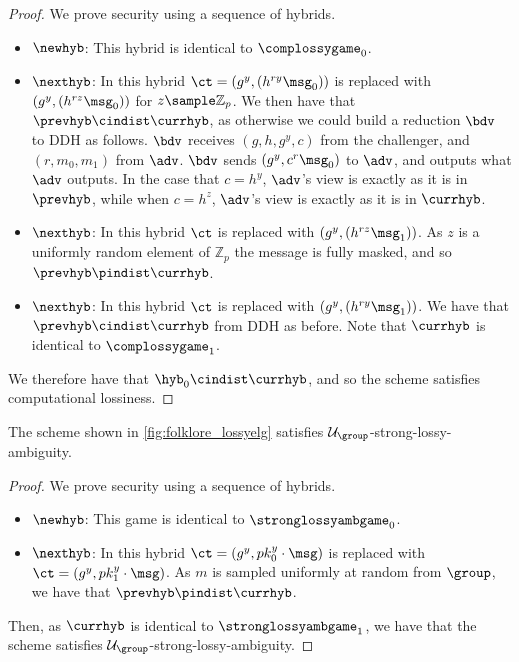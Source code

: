 \begin{proof}
	We prove security using a sequence of hybrids.

	\begin{itemize}
		\item $\newhyb$: This hybrid is identical to $\complossygame_0$.
		\item $\nexthyb$: In this hybrid $\ct = (g^y, (h^{ry}\msg_0))$ is replaced with $(g^y, (h^{rz}\msg_0))$ for $z \sample \mathbb{Z}_p$.
		      We then have that $\prevhyb \cindist \currhyb$, as otherwise we could build a reduction $\bdv$ to DDH as follows.
		      $\bdv$ receives $(g, h, g^y, c)$ from the challenger, and $(r, m_0, m_1)$ from $\adv$.
		      $\bdv$ sends $(g^y, c^r\msg_0)$ to $\adv$, and outputs what $\adv$ outputs.
		      In the case that $c = h^y$, $\adv$'s view is exactly as it is in $\prevhyb$, while when $c = h^z$, $\adv$'s view is exactly as it is in $\currhyb$.
		\item $\nexthyb$: In this hybrid $\ct$ is replaced with $(g^y, (h^{rz}\msg_1))$.
		      As $z$ is a uniformly random element of $\mathbb{Z}_p$ the message is fully masked, and so $\prevhyb \pindist \currhyb$.
		\item $\nexthyb$: In this hybrid $\ct$ is replaced with $(g^y, (h^{ry}\msg_1))$.
		      We have that $\prevhyb \cindist \currhyb$ from DDH as before.
		      Note that $\currhyb$ is identical to $\complossygame_1$.
	\end{itemize}
	We therefore have that $\hyb_0 \cindist \currhyb$, and so the scheme satisfies computational lossiness.

\end{proof}

\begin{theorem}
	The scheme shown in \cref{fig:folklore_lossyelg} satisfies $\mathcal{U}_\group$-strong-lossy-ambiguity.
\end{theorem}

\begin{proof}
	We prove security using a sequence of hybrids.

	\begin{itemize}
		\item $\newhyb$: This game is identical to $\stronglossyambgame_0$.
		\item $\nexthyb$: In this hybrid $\ct = (g^y, pk_0^y\cdot \msg)$ is replaced with $\ct = (g^y, pk_1^y\cdot \msg)$.
		      As $m$ is sampled uniformly at random from $\group$, we have that $\prevhyb \pindist \currhyb$.
	\end{itemize}

	Then, as $\currhyb$ is identical to $\stronglossyambgame_1$, we have that the scheme satisfies $\mathcal{U}_\group$-strong-lossy-ambiguity.
\end{proof}

